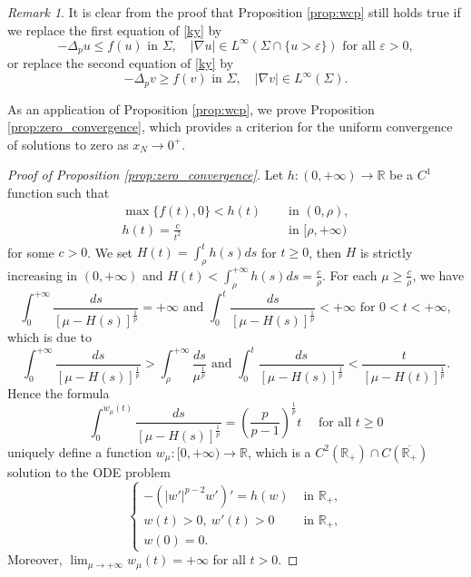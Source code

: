\documentclass[reqno]{amsart}
\theoremstyle{plain}
\theoremstyle{definition}
\theoremstyle{remark}
\newtheorem{remark}{Remark}
\begin{document}
	\begin{remark}\label{rem:ineq} It is clear from the proof that Proposition \ref{prop:wcp} still holds true if we replace the first equation of \eqref{ky} by
		\[
		-\Delta_p u \le f(u) \text{ in } \Sigma, \quad |\nabla u| \in L^\infty(\Sigma\cap\{u>\varepsilon\}) \text{ for all } \varepsilon>0,
		\]
		or replace the second equation of \eqref{ky} by
		\[
		-\Delta_p v \ge f(v) \text{ in } \Sigma, \quad |\nabla v| \in L^\infty(\Sigma).
		\]
	\end{remark}
	
	As an application of Proposition \ref{prop:wcp}, we prove Proposition \ref{prop:zero_convergence}, which provides a criterion for the uniform convergence of solutions to zero as $x_N\to 0^+$.	
	\begin{proof}[Proof of Proposition \ref{prop:zero_convergence}]
		Let $h:(0,+\infty) \to \mathbb{R}$ be a $C^1$ function such that
		\begin{align*}
			\max\{f(t), 0\} < h(t) &\quad\text{ in } (0,\rho),\\
			h(t) = \frac{c}{t^2} &\quad\text{ in } [\rho,+\infty)
		\end{align*}
		for some $c>0$.
		We set $H(t) = \int_{\rho}^{t} h(s) ds$ for $t\ge0$, then $H$ is strictly increasing in $(0,+\infty)$ and $H(t) < \int_{\rho}^{+\infty} h(s) ds = \frac{c}{\rho}$. For each $\mu \ge \frac{c}{\rho}$, we have
		\[
		\int_{0}^{+\infty} \frac{ds}{\left[\mu-H(s)\right]^\frac{1}{p}} = +\infty \text{ and } \int_{0}^{t} \frac{ds}{\left[\mu-H(s)\right]^\frac{1}{p}} < +\infty \text{ for } 0<t<+\infty,
		\]
		which is due to
		\[
		\int_{0}^{+\infty} \frac{ds}{\left[\mu-H(s)\right]^\frac{1}{p}} > \int_{\rho}^{+\infty} \frac{ds}{\mu^\frac{1}{p}} \text{ and }
		\int_{0}^{t} \frac{ds}{\left[\mu-H(s)\right]^\frac{1}{p}} < \frac{t}{\left[\mu-H(t)\right]^\frac{1}{p}}.
		\]
		Hence the formula
		\[
		\int_{0}^{w_\mu(t)} \frac{ds}{\left[\mu-H(s)\right]^\frac{1}{p}} = \left(\frac{p}{p-1}\right)^\frac{1}{p}t \quad\text{ for all } t\ge0
		\]
		uniquely define a function $w_\mu:[0,+\infty)\to\mathbb{R}$, which is a $C^2(\mathbb{R}_+) \cap C(\overline{\mathbb{R}_+})$ solution to the ODE problem
		\[
		\begin{cases}
			-(|w'|^{p-2}w')' = h(w) &\text{ in } \mathbb{R}_+,\\
			w(t) > 0, ~ w'(t) > 0 &\text{ in } \mathbb{R}_+,\\
			w(0) = 0.
		\end{cases}
		\]
		Moreover, $\lim_{\mu\to+\infty} w_\mu(t) = +\infty$ for all $t>0$.
		

\end{proof}
\end{document}
